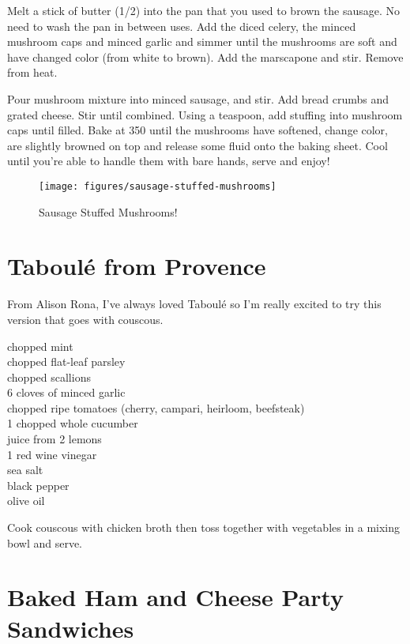 Melt a stick of butter (\SI{1/2}{\cup}) into the pan that you used to brown the
sausage. No need to wash the pan in between uses. Add the diced celery, the
minced mushroom caps and minced garlic and simmer until the mushrooms are soft
and have changed color (from white to brown). Add the marscapone and stir.
Remove from heat.

Pour mushroom mixture into minced sausage, and stir. Add bread crumbs and grated
cheese. Stir until combined. Using a teaspoon, add stuffing into mushroom caps
until filled. Bake at \SI{350}{\degreeF} until the mushrooms have softened,
change color, are slightly browned on top and release some fluid onto the baking
sheet. Cool until you're able to handle them with bare hands, serve and enjoy!
\begin{figure}
    \centering
    \texttt{[image: figures/sausage-stuffed-mushrooms]}
    \caption*{Sausage Stuffed Mushrooms!}
\end{figure}

\section{Taboul\'{e} from Provence}

\begin{open}
    From Alison Rona, I've always loved Taboul\'{e} so I'm really excited to try this version that goes with couscous.
\end{open}
\begin{ingredients}
    chopped mint\\
    chopped flat-leaf parsley\\
    chopped scallions\\
    6 cloves of minced garlic\\
    chopped ripe tomatoes (cherry, campari, heirloom, beefsteak)\\
    1 chopped whole cucumber\\
    juice from 2 lemons\\
    \SI{1}{\tblspoon} red wine vinegar\\
    sea salt\\
    black pepper\\
    olive oil
\end{ingredients}
Cook couscous with chicken broth then toss together with vegetables in a mixing bowl and serve.

\section{Baked Ham and Cheese Party Sandwiches}

